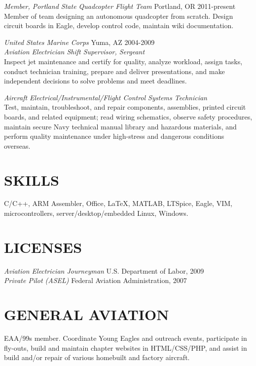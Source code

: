 \documentclass[margin]{res}
\begin{document}
\begin{resume}
		{\sl Member, Portland State Quadcopter Flight Team} \hfill Portland, OR 2011-present\\
		Member of team designing an autonomous quadcopter from scratch. Design circuit boards in Eagle, develop control code, maintain wiki documentation.
		
		{\sl United States Marine Corps} \hfill Yuma, AZ 2004-2009 \\
                {\sl Aviation Electrician Shift Supervisor, Sergeant} \\
                Inspect jet maintenance and certify for quality, analyze workload, assign tasks, conduct technician training, prepare and deliver presentations, and make independent decisions to solve problems and meet deadlines.

	{\sl Aircraft Electrical/Instrumental/Flight Control Systems Technician} \\	Test, maintain, troubleshoot, and repair components, assemblies, printed circuit boards, and related equipment; read wiring schematics, observe safety procedures, maintain secure Navy technical manual library and hazardous materials, and perform quality maintenance under high-stress and dangerous conditions overseas.

\section{SKILLS} C/C++, ARM Assembler, Office, LaTeX, MATLAB, LTSpice, Eagle, VIM, microcontrollers, server/desktop/embedded Linux, Windows.

\section{LICENSES} {\sl Aviation Electrician Journeyman} \hfill U.S. Department of Labor, 2009\\
	{\sl Private Pilot (ASEL)} \hfill Federal Aviation Administration, 2007
 
\section{GENERAL AVIATION} EAA/99s member. Coordinate Young Eagles and outreach events, participate in fly-outs, build and maintain chapter websites in HTML/CSS/PHP, and assist in build and/or repair of various homebuilt and factory aircraft.

\end{resume}
\end{document}
